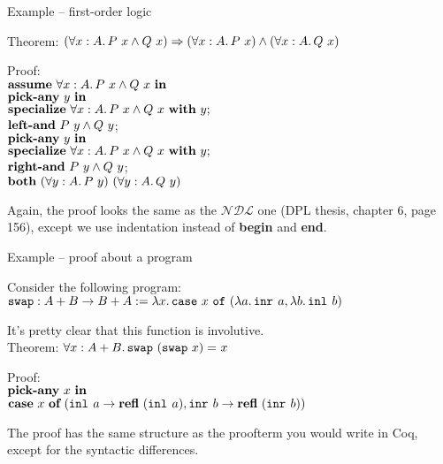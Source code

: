 \documentclass{beamer}
\newcommand{\NDL}{\mathcal{NDL}}
\begin{document}
\begin{frame}{Example -- first-order logic}

Theorem: $\Impl{(\All{x}[A]{\And{\app{P}{x}}{\app{Q}{x}}})}{\And{(\All{x}[A]{\app{P}{x}})}{(\All{x}[A]{\app{Q}{x}})}}$

\vspace{2em}

Proof: \\
$\implintro{\All{x}[A]{\And{\app{P}{x}}{\app{Q}{x}}}}{}$ \\
\quad $\allintro{y}{}$ \\
\qquad $\allelim{\All{x}[A]{\And{\app{P}{x}}{\app{Q}{x}}}}{y};$ \\
\qquad $\andeliml{\And{\app{P}{y}}{\app{Q}{y}}}$; \\
\quad $\allintro{y}{}$ \\
\qquad $\allelim{\All{x}[A]{\And{\app{P}{x}}{\app{Q}{x}}}}{y};$ \\
\qquad $\andelimr{\And{\app{P}{y}}{\app{Q}{y}}}$; \\
\quad $\andintro{(\All{y}[A]{\app{P}{y}})}{(\All{y}[A]{\app{Q}{y}})}$ \\

\vspace{2em}

Again, the proof looks the same as the $\NDL$ one (DPL thesis, chapter 6, page 156), except we use indentation instead of \textbf{begin} and \textbf{end}.

\end{frame}

\begin{frame}{Example -- proof about a program}

Consider the following program: \\
$\swap : \Fun{\Sum{A}{B}}{\Sum{B}{A}} := \fun{x}{\case{x}{\fun{a}{\inr{a}}}{\fun{b}{\inl{b}}}}$ \\

\vspace{2em}

It's pretty clear that this function is involutive. \\
Theorem: $\All{x}[\Sum{A}{B}]{\Eq{\swap[(\swap[x])]}{x}}$

\vspace{1em}

Proof: \\
$\allintro{x}{}$ \\
\quad $\sumind{x}{a}{\refl[(\inl{a})]}{b}{\refl[(\inr{b})]}$

\vspace{2em}

The proof has the same structure as the proofterm you would write in Coq, except for the syntactic differences.

\end{frame}
\end{document}
